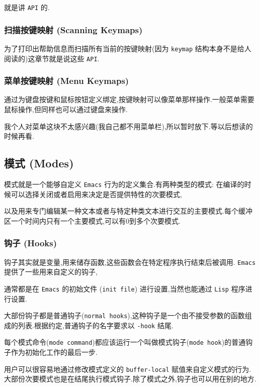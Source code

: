 \documentclass[11pt]{article}
\begin{document}
就是讲 \texttt{API} 的.


\subsubsection{扫描按键映射 (Scanning Keymaps)}
\label{sec:org3839676}

为了打印出帮助信息而扫描所有当前的按键映射(因为 \texttt{keymap} 结构本身不是给人阅读的)这章节就是说这些 \texttt{API}.


\subsubsection{菜单按键映射 (Menu Keymaps)}
\label{sec:orgcff0a38}

通过为键盘按键和鼠标按钮定义绑定,按键映射可以像菜单那样操作.一般菜单需要鼠标操作,但同样也可以通过键盘来操作.

我个人对菜单这块不太感兴趣(我自己都不用菜单栏),所以暂时放下.等以后想读的时候再看.


\subsection{模式 (Modes)}
\label{sec:org6dba8d0}

模式就是一个能够自定义 \texttt{Emacs} 行为的定义集合.有两种类型的模式: 在编译的时候可以选择关闭或者启用来决定是否提供特性的次要模式,

以及用来专门编辑某一种文本或者与特定种类文本进行交互的主要模式.每个缓冲区一个时间内只有一个主要模式,可以有0到多个次要模式.


\subsubsection{钩子 (Hooks)}
\label{sec:orgbed1f03}

钩子其实就是变量,用来储存函数,这些函数会在特定程序执行结束后被调用. \texttt{Emacs} 提供了一些用来自定义的钩子,

通常都是在 \texttt{Emacs} 的初始文件 (\texttt{init file}) 进行设置,当然也能通过 \texttt{Lisp} 程序进行设置.

大部份钩子都是普通钩子(\texttt{normal hooks}),这种钩子是一个由不接受参数的函数组成的列表.根据约定,普通钩子的名字要求以 \texttt{-hook} 结尾.

每个模式命令(\texttt{mode command})都应该运行一个叫做模式钩子(\texttt{mode hook})的普通钩子作为初始化工作的最后一步.

用户可以很容易地通过修改模式定义的 \texttt{buffer-local} 赋值来自定义模式的行为.大部份次要模式也是在结尾执行模式钩子.除了模式之外,钩子也可以用在别的地方.
\end{document}
